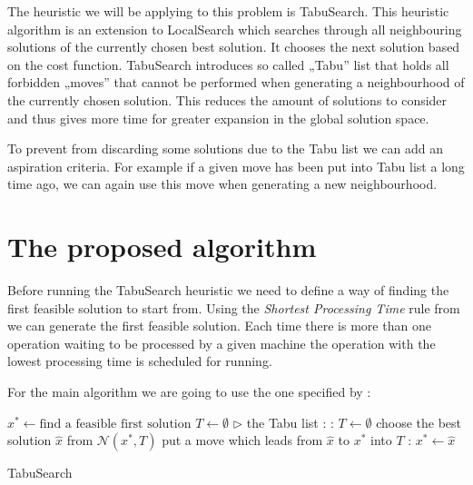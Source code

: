 \documentclass[14pt]{article}
\begin{document}
The heuristic we will be applying to this problem is TabuSearch. This heuristic algorithm is an extension to LocalSearch which searches through all neighbouring solutions of the currently chosen best solution. It chooses the next solution based on the cost function. TabuSearch introduces so called „Tabu” list that holds all forbidden „moves” that cannot be performed when generating a neighbourhood of the currently chosen solution. This reduces the amount of solutions to consider and thus gives more time for greater expansion in the global solution space.

To prevent from discarding some solutions due to the Tabu list we can add an aspiration criteria. For example if a given move has been put into Tabu list a long time ago, we can again use this move when generating a new neighbourhood.

\section{The proposed algorithm}

Before running the TabuSearch heuristic we need to define a way of finding the first feasible solution to start from.
Using the \textit{Shortest Processing Time} rule from \citet[section 2.1]{brandimarte} we can generate the first feasible solution. Each time there is more than one operation waiting to be processed by a given machine the operation with the lowest processing time is scheduled for running.

For the main algorithm we are going to use the one specified by \citet[section 2.]{amico-trubian}:

\begin{algorithm}[H]
  \begin{algorithmic}[1]
    \State $x^* \gets \text{find a feasible first solution}$
    \State $T \gets \emptyset$ $\triangleright$ the Tabu list
    :
      : \label{ts-emptying-tabu}
        \State $T \gets \emptyset$
      \EndIf
      \State choose the best solution $\hat{x}$ from $\mathcal{N}(x^*, T)$ \label{ts-neighbourhood}
      \State put a move which leads from $\hat{x}$ to $x^*$ into $T$
      :
        \State $x^* \gets \hat{x}$
      \EndIf
    \EndWhile
  \end{algorithmic}
  \caption{TabuSearch}
  \label{tabu-search}
\end{algorithm}
\end{document}
